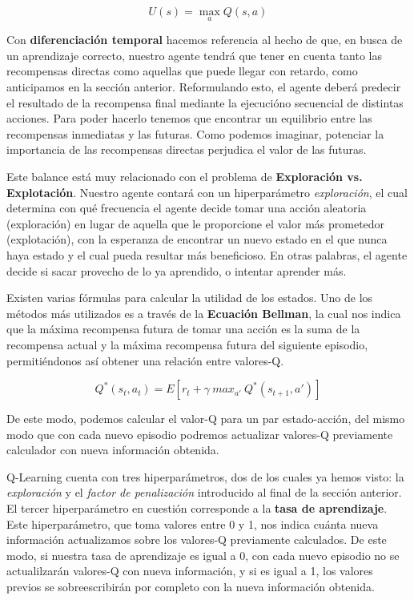 \begin{equation}
    U(s) = \max_{a}Q(s, a)
\end{equation}

Con \textbf{diferenciación temporal} hacemos referencia al hecho de que, en busca de un aprendizaje correcto, nuestro agente tendrá que tener en cuenta tanto las recompensas directas como aquellas que puede llegar con retardo, como anticipamos en la sección anterior. Reformulando esto, el agente deberá predecir el resultado de la recompensa final mediante la ejecucióno secuencial de distintas acciones. Para poder hacerlo tenemos que encontrar un equilibrio entre las recompensas inmediatas y las futuras. Como podemos imaginar, potenciar la importancia de las recompensas directas perjudica el valor de las futuras.

Este balance está muy relacionado con el problema de \textbf{Exploración vs. Explotación}. Nuestro agente contará con un hiperparámetro \textit{exploración}, el cual determina con qué frecuencia el agente decide tomar una acción aleatoria (exploración) en lugar de aquella que le proporcione el valor más prometedor (explotación), con la esperanza de encontrar un nuevo estado en el que nunca haya estado y el cual pueda resultar más beneficioso. En otras palabras, el agente decide si sacar provecho de lo ya aprendido, o intentar aprender más.

Existen varias fórmulas para calcular la utilidad de los estados. Uno de los métodos más utilizados es a través de la \textbf{Ecuación Bellman}, la cual nos indica que la máxima recompensa futura de tomar una acción es la suma de la recompensa actual y la máxima recompensa futura del siguiente episodio, permitiéndonos así obtener una relación entre valores-Q.

\begin{equation}
    Q^*(s_{t}, a_{t}) = E [ r_{t} + \gamma\ max_{a'}\ Q^*(s_{t+1}, a')]
\end{equation}

De este modo, podemos calcular el valor-Q para un par estado-acción, del mismo modo que con cada nuevo episodio podremos actualizar valores-Q previamente calculador con nueva información obtenida.

Q-Learning cuenta con tres hiperparámetros, dos de los cuales ya hemos visto: la \textit{exploración} y el \textit{factor de penalización} introducido al final de la sección anterior. El tercer hiperparámetro en cuestión corresponde a la \textbf{tasa de aprendizaje}. Este hiperparámetro, que toma valores entre 0 y 1, nos indica cuánta nueva información actualizamos sobre los valores-Q previamente calculados. De este modo, si nuestra tasa de aprendizaje es igual a 0, con cada nuevo episodio no se actualilzarán valores-Q con nueva información, y si es igual a 1, los valores previos se sobreescribirán por completo con la nueva información obtenida.

